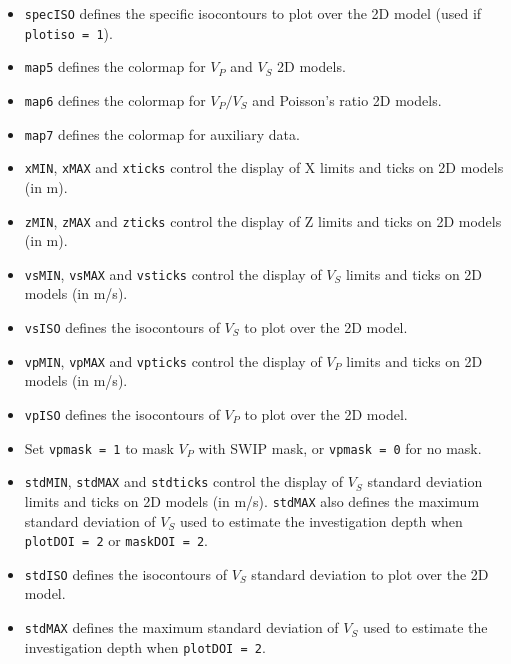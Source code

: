 \documentclass[twoside,a4paper]{article}
\begin{document}
\begin{itemize}[leftmargin=*]
\item \verb|specISO| defines the specific isocontours to plot over the 2D model (used if \verb|plotiso = 1|).\\[2ex]

\item \verb|map5| defines the colormap for $V_P$ and $V_S$ 2D models.

\item \verb|map6| defines the colormap for $V_P/V_S$ and Poisson's ratio 2D models.

\item \verb|map7| defines the colormap for auxiliary data.\\[2ex]

\item \verb|xMIN|, \verb|xMAX| and \verb|xticks| control the display of X limits and ticks on 2D models (in m).

\item \verb|zMIN|, \verb|zMAX| and \verb|zticks| control the display of Z limits and ticks on 2D models (in m).

\item \verb|vsMIN|, \verb|vsMAX| and \verb|vsticks| control the display of $V_S$ limits and ticks on 2D models (in m/s).

\item \verb|vsISO| defines the isocontours of $V_S$ to plot over the 2D model.

\item \verb|vpMIN|, \verb|vpMAX| and \verb|vpticks| control the display of $V_P$ limits and ticks on 2D models (in m/s).

\item \verb|vpISO| defines the isocontours of $V_P$ to plot over the 2D model.

\item Set \verb|vpmask = 1| to mask $V_P$ with SWIP mask, or \verb|vpmask = 0| for no mask.

\item \verb|stdMIN|, \verb|stdMAX| and \verb|stdticks| control the display of $V_S$ standard deviation limits and ticks on 2D models (in m/s). \verb|stdMAX| also defines the maximum standard deviation of $V_S$ used to estimate the investigation depth when \verb|plotDOI = 2| or \verb|maskDOI = 2|.

\item \verb|stdISO| defines the isocontours of $V_S$ standard deviation to plot over the 2D model.

\item \verb|stdMAX| defines the maximum standard deviation of $V_S$ used to estimate the investigation depth when \verb|plotDOI = 2|.


\end{itemize}
\end{document}
